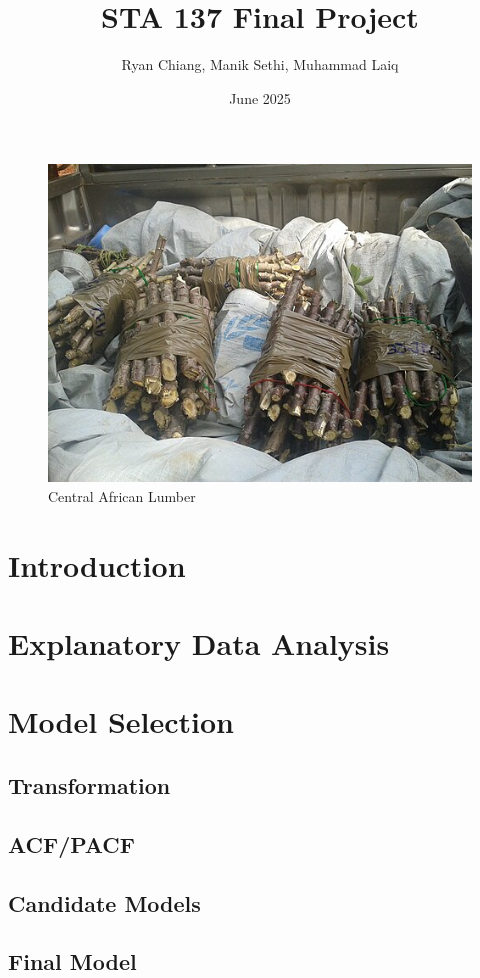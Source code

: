 \documentclass[11pt]{article}
\title{STA 137 Final Project}
\author{Ryan Chiang, Manik Sethi, Muhammad Laiq }
\date{June 2025}
\begin{document}
\maketitle


\begin{figure}[H]
    \centering
    \includegraphics[width=0.3\linewidth]{central_africa_republic.jpg}
    \caption{Central African Lumber}
    \label{fig:enter-label}
\end{figure}




\tableofcontents

\newcommand{\numberedpart}[1]{%
    \part{#1}%
}

\section{Introduction}

\section{Explanatory Data Analysis}



\section{Model Selection}
\subsection{Transformation}
\subsection{ACF/PACF}
\subsection{Candidate Models}
\subsection{Final Model}
\end{document}
